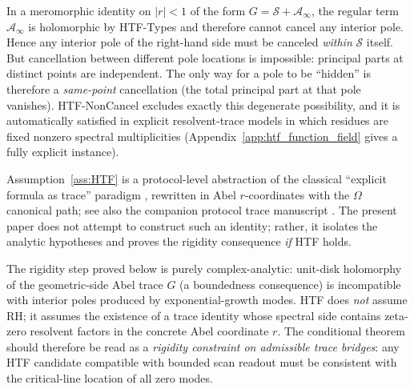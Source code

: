 \begin{remark}
\label{rem:noncancel_discussion}
In a meromorphic identity on $|r|<1$ of the form $G=\mathcal{S}+\mathcal{A}_\infty$, the regular term $\mathcal{A}_\infty$ is holomorphic by HTF-Types and therefore cannot cancel any interior pole.
Hence any interior pole of the right-hand side must be canceled \emph{within} $\mathcal{S}$ itself.
But cancellation between different pole locations is impossible: principal parts at distinct points are independent.
The only way for a pole to be ``hidden'' is therefore a \emph{same-point} cancellation (the total principal part at that pole vanishes).
HTF-NonCancel excludes exactly this degenerate possibility, and it is automatically satisfied in explicit resolvent-trace models in which residues are fixed nonzero spectral multiplicities (Appendix~\ref{app:htf_function_field} gives a fully explicit instance).
\end{remark}

Assumption~\ref{ass:HTF} is a protocol-level abstraction of the classical ``explicit formula as trace'' paradigm \cite{Connes1999,IwaniecKowalski2004,Titchmarsh1986}, rewritten in Abel $r$-coordinates with the $\Omega$ canonical path; see also the companion protocol trace manuscript \cite{Ma2025RGS}.
The present paper does not attempt to construct such an identity; rather, it isolates the analytic hypotheses and proves the rigidity consequence \emph{if} HTF holds.

\begin{remark}
\label{rem:htf_not_circular}
The rigidity step proved below is purely complex-analytic: unit-disk holomorphy of the geometric-side Abel trace $G$ (a boundedness consequence) is incompatible with interior poles produced by exponential-growth modes.
HTF does \emph{not} assume RH; it assumes the existence of a trace identity whose spectral side contains zeta-zero resolvent factors in the concrete Abel coordinate $r$.
The conditional theorem should therefore be read as a \emph{rigidity constraint on admissible trace bridges}: any HTF candidate compatible with bounded scan readout must be consistent with the critical-line location of all zero modes.
\end{remark}


